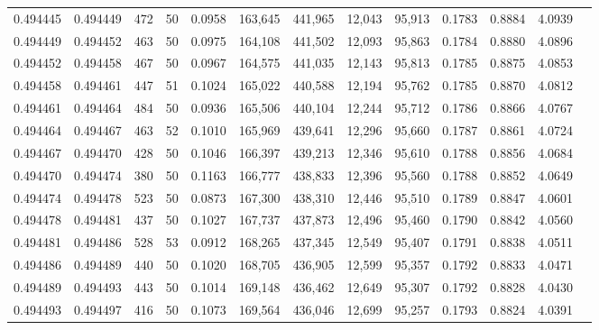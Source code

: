 \begin{tabular}{rrrrrrrrrrrrr}
0.494445 & 0.494449 &   472 &  50 &                                     0.0958 & 163,645 & 441,965 &  12,043 &  95,913 & 0.1783 & 0.8884 & 4.0939 \\
0.494449 & 0.494452 &   463 &  50 &                                     0.0975 & 164,108 & 441,502 &  12,093 &  95,863 & 0.1784 & 0.8880 & 4.0896 \\
0.494452 & 0.494458 &   467 &  50 &                                     0.0967 & 164,575 & 441,035 &  12,143 &  95,813 & 0.1785 & 0.8875 & 4.0853 \\
0.494458 & 0.494461 &   447 &  51 &                                     0.1024 & 165,022 & 440,588 &  12,194 &  95,762 & 0.1785 & 0.8870 & 4.0812 \\
0.494461 & 0.494464 &   484 &  50 &                                     0.0936 & 165,506 & 440,104 &  12,244 &  95,712 & 0.1786 & 0.8866 & 4.0767 \\
0.494464 & 0.494467 &   463 &  52 &                                     0.1010 & 165,969 & 439,641 &  12,296 &  95,660 & 0.1787 & 0.8861 & 4.0724 \\
0.494467 & 0.494470 &   428 &  50 &                                     0.1046 & 166,397 & 439,213 &  12,346 &  95,610 & 0.1788 & 0.8856 & 4.0684 \\
0.494470 & 0.494474 &   380 &  50 &                                     0.1163 & 166,777 & 438,833 &  12,396 &  95,560 & 0.1788 & 0.8852 & 4.0649 \\
0.494474 & 0.494478 &   523 &  50 &                                     0.0873 & 167,300 & 438,310 &  12,446 &  95,510 & 0.1789 & 0.8847 & 4.0601 \\
0.494478 & 0.494481 &   437 &  50 &                                     0.1027 & 167,737 & 437,873 &  12,496 &  95,460 & 0.1790 & 0.8842 & 4.0560 \\
0.494481 & 0.494486 &   528 &  53 &                                     0.0912 & 168,265 & 437,345 &  12,549 &  95,407 & 0.1791 & 0.8838 & 4.0511 \\
0.494486 & 0.494489 &   440 &  50 &                                     0.1020 & 168,705 & 436,905 &  12,599 &  95,357 & 0.1792 & 0.8833 & 4.0471 \\
0.494489 & 0.494493 &   443 &  50 &                                     0.1014 & 169,148 & 436,462 &  12,649 &  95,307 & 0.1792 & 0.8828 & 4.0430 \\
0.494493 & 0.494497 &   416 &  50 &                                     0.1073 & 169,564 & 436,046 &  12,699 &  95,257 & 0.1793 & 0.8824 & 4.0391 \\

\end{tabular}
